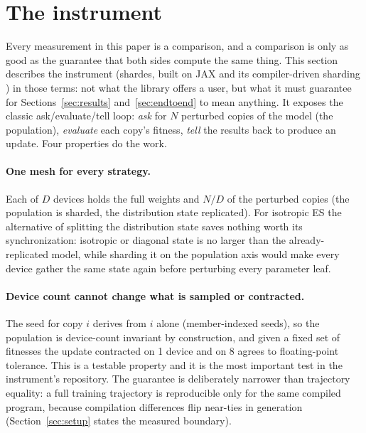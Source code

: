 \section{The instrument}
\label{sec:design}

Every measurement in this paper is a comparison, and a comparison is only as
good as the guarantee that both sides compute the same thing. This section
describes the instrument (shardes, built on JAX and its
compiler-driven sharding \citealp{jax2018,gspmd2021}) in those terms: not what the library
offers a user, but what it must guarantee for Sections~\ref{sec:results}
and~\ref{sec:endtoend} to mean anything. It exposes the classic
ask/evaluate/tell loop: \emph{ask} for $N$ perturbed copies of the model (the
population), \emph{evaluate} each copy's fitness, \emph{tell} the results
back to produce an update. Four properties do the work.

\paragraph{One mesh for every strategy.} Each of
$D$ devices holds the full weights and $N/D$ of the perturbed copies (the
population is sharded, the distribution state replicated). For isotropic ES
the alternative of splitting the distribution state saves nothing worth its
synchronization: isotropic or diagonal state is no larger than the
already-replicated model, while sharding it on the population axis would make
every device gather the same state again before perturbing every parameter
leaf.

\paragraph{Device count cannot change what is sampled or contracted.}
The seed for copy $i$ derives from $i$ alone (member-indexed seeds), so the
population is device-count invariant by construction, and given a fixed set
of fitnesses the update contracted on 1 device and on 8 agrees to
floating-point tolerance. This is a testable property and it is the most
important test in the instrument's repository. The guarantee is deliberately narrower
than trajectory equality: a full training trajectory is reproducible only
for the same compiled program, because compilation differences flip
near-ties in generation (Section~\ref{sec:setup} states the measured
boundary).

